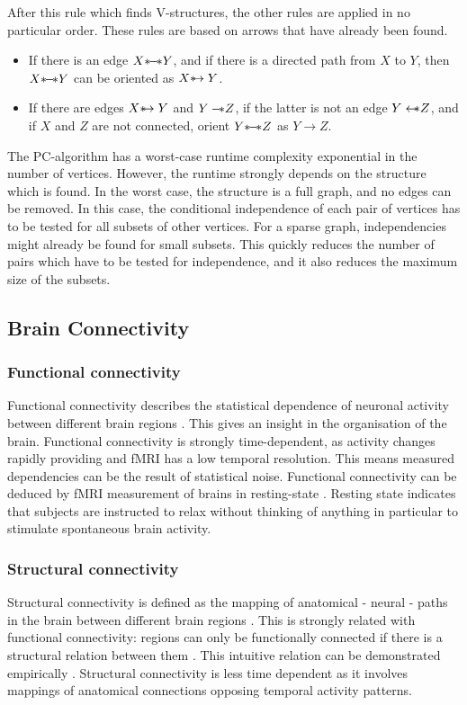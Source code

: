 \documentclass[a4paper, 10pt, english, onecolumn]{article}
\def \srightarrow {\text{\textasteriskcentered}\hspace{-0.62em}\rightarrow}
\def \sleftarrow {\leftarrow\hspace{-0.62em}\text{\textasteriskcentered}}
\def \sleftline {-\hspace{-0.40em}\text{\textasteriskcentered}}
\def \sline {\text{\textasteriskcentered}\hspace{-0.38em}-\hspace{-0.4em}\text{\textasteriskcentered}}
\begin{document}
After this rule which finds V-structures, the other rules are applied in no particular order. These rules are based on arrows that have already been found.
\begin{itemize}
\item If there is an edge $X \sline Y$, and if there is a directed path from $X$ to $Y$, then $X \sline Y$ can be oriented as $X \srightarrow Y$.
\item If there are edges $X \srightarrow Y$ and $Y \sleftline Z$, if the latter is not an edge $Y \sleftarrow Z$, and if $X$ and $Z$ are not connected, orient $Y \sline Z$ as $Y \rightarrow Z$. 
\end{itemize}

The PC-algorithm has a worst-case runtime complexity exponential in the number of vertices.
However, the runtime strongly depends on the structure which is found.
In the worst case, the structure is a full graph, and no edges can be removed.
In this case, the conditional independence of each pair of vertices has to be tested for all subsets of other vertices.
For a sparse graph, independencies might already be found for small subsets.
This quickly reduces the number of pairs which have to be tested for independence, and it also reduces the maximum size of the subsets.

\subsection{Brain Connectivity}

\subsubsection{Functional connectivity}
Functional connectivity describes the statistical dependence of neuronal activity between different brain regions \cite{friston1993functional}.
This gives an insight in the organisation of the brain.
Functional connectivity is strongly time-dependent, as activity changes rapidly providing and fMRI has a low temporal resolution.
This means measured dependencies can be the result of statistical noise.
Functional connectivity can be deduced by fMRI measurement of brains in resting-state \cite{Lowe2000, doria2010, Bullmore2009}.
Resting state indicates that subjects are instructed to relax without thinking of anything in particular to stimulate spontaneous brain activity.

\subsubsection{Structural connectivity}
Structural connectivity is defined as the mapping of anatomical - neural - paths in the brain between different brain regions \cite{friston1994}.
This is strongly related with functional connectivity: regions can only be functionally connected if there is a structural relation between them \cite{cabral2012}.
This intuitive relation can be demonstrated empirically \cite{vandenheuvel2009}.
Structural connectivity is less time dependent as it involves mappings of anatomical connections opposing temporal activity patterns.
\end{document}
